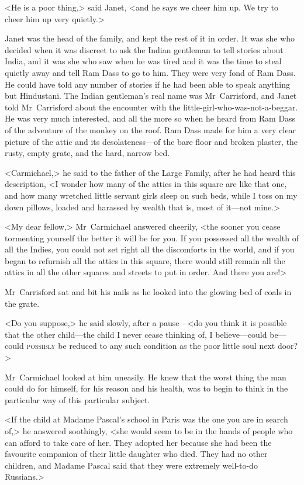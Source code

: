 <He is a poor thing,> said Janet, <and he says we cheer him up. We try to cheer him up very quietly.>

Janet was the head of the family, and kept the rest of it in order. It was she who decided when it was discreet to ask the Indian gentleman to tell stories about India, and it was she who saw when he was tired and it was the time to steal quietly away and tell Ram Dass to go to him. They were very fond of Ram Dass. He could have told any number of stories if he had been able to speak anything but Hindustani. The Indian gentleman's real name was Mr~Carrisford, and Janet told Mr~Carrisford about the encounter with the little-girl-who-was-not-a-beggar. He was very much interested, and all the more so when he heard from Ram Dass of the adventure of the monkey on the roof. Ram Dass made for him a very clear picture of the attic and its desolateness—of the bare floor and broken plaster, the rusty, empty grate, and the hard, narrow bed.

<Carmichael,> he said to the father of the Large Family, after he had heard this description, <I wonder how many of the attics in this square are like that one, and how many wretched little servant girls sleep on such beds, while I toss on my down pillows, loaded and harassed by wealth that is, most of it—not mine.>

<My dear fellow,> Mr~Carmichael answered cheerily, <the sooner you cease tormenting yourself the better it will be for you. If you possessed all the wealth of all the Indies, you could not set right all the discomforts in the world, and if you began to refurnish all the attics in this square, there would still remain all the attics in all the other squares and streets to put in order. And there you are!>

Mr~Carrisford sat and bit his nails as he looked into the glowing bed of coals in the grate.

<Do you suppose,> he said slowly, after a pause—<do you think it is possible that the other child—the child I never cease thinking of, I believe—could be—could \textsc{possibly} be reduced to any such condition as the poor little soul next door?>

Mr~Carmichael looked at him uneasily. He knew that the worst thing the man could do for himself, for his reason and his health, was to begin to think in the particular way of this particular subject.

<If the child at Madame Pascal's school in Paris was the one you are in search of,> he answered soothingly, <she would seem to be in the hands of people who can afford to take care of her. They adopted her because she had been the favourite companion of their little daughter who died. They had no other children, and Madame Pascal said that they were extremely well-to-do Russians.>

